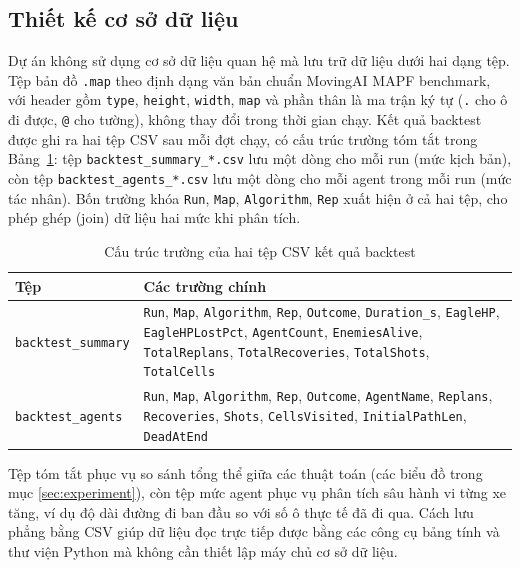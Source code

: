 \documentclass[../DoAn.tex]{subfiles}
\begin{document}
\subsection{Thiết kế cơ sở dữ liệu}

Dự án không sử dụng cơ sở dữ liệu quan hệ mà lưu trữ dữ liệu dưới hai dạng tệp. Tệp bản
đồ \texttt{.map} theo định dạng văn bản chuẩn MovingAI MAPF benchmark, với header gồm
\texttt{type}, \texttt{height}, \texttt{width}, \texttt{map} và phần thân là ma trận ký
tự (\texttt{.} cho ô đi được, \texttt{@} cho tường), không thay đổi trong thời gian chạy.
Kết quả backtest được ghi ra hai tệp CSV sau mỗi đợt chạy, có cấu trúc trường tóm tắt
trong Bảng~\ref{tab:csv_schema}: tệp \texttt{backtest\_summary\_*.csv} lưu một dòng cho
mỗi run (mức kịch bản), còn tệp \texttt{backtest\_agents\_*.csv} lưu một dòng cho mỗi agent
trong mỗi run (mức tác nhân). Bốn trường khóa \texttt{Run}, \texttt{Map}, \texttt{Algorithm},
\texttt{Rep} xuất hiện ở cả hai tệp, cho phép ghép (join) dữ liệu hai mức khi phân tích.

\begin{table}[htbp]
\centering
\caption{Cấu trúc trường của hai tệp CSV kết quả backtest}
\label{tab:csv_schema}
\small
\begin{tabular}{l>{\raggedright\arraybackslash}p{9.5cm}}
\hline
\textbf{Tệp} & \textbf{Các trường chính} \\ \hline
\texttt{backtest\_summary} & \texttt{Run}, \texttt{Map}, \texttt{Algorithm}, \texttt{Rep},
\texttt{Outcome}, \texttt{Duration\_s}, \texttt{EagleHP}, \texttt{EagleHPLostPct},
\texttt{AgentCount}, \texttt{EnemiesAlive}, \texttt{TotalReplans}, \texttt{TotalRecoveries},
\texttt{TotalShots}, \texttt{TotalCells} \\ \hline
\texttt{backtest\_agents} & \texttt{Run}, \texttt{Map}, \texttt{Algorithm}, \texttt{Rep},
\texttt{Outcome}, \texttt{AgentName}, \texttt{Replans}, \texttt{Recoveries}, \texttt{Shots},
\texttt{CellsVisited}, \texttt{InitialPathLen}, \texttt{DeadAtEnd} \\ \hline
\end{tabular}
\end{table}

Tệp tóm tắt phục vụ so sánh tổng thể giữa các thuật toán (các biểu đồ trong mục
\ref{sec:experiment}), còn tệp mức agent phục vụ phân tích sâu hành vi từng xe tăng, ví dụ
độ dài đường đi ban đầu so với số ô thực tế đã đi qua. Cách lưu phẳng bằng CSV giúp dữ liệu
đọc trực tiếp được bằng các công cụ bảng tính và thư viện Python mà không cần thiết lập máy
chủ cơ sở dữ liệu.
\end{document}
